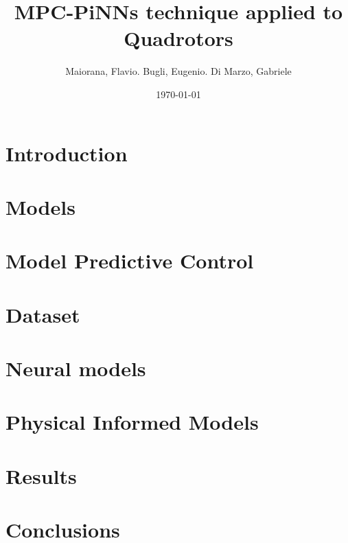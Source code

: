 \documentclass[12pt]{article}
\title{MPC-PiNNs technique applied to Quadrotors}
\author{Maiorana, Flavio. Bugli, Eugenio. Di Marzo, Gabriele}
\date{\today} %
\begin{document}
\setlength{\parindent}{0pt}

\maketitle

\tableofcontents
\clearpage
\section{Introduction} 
\section{Models} 
\section{Model Predictive Control} 
\section{Dataset} 
\section{Neural models} 
\section{Physical Informed Models} 
\section{Results} 

\section{Conclusions} 

  

\end{document}
